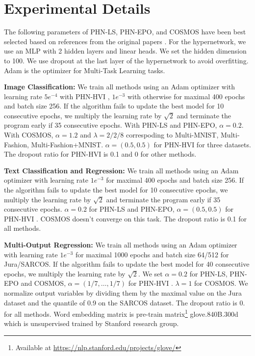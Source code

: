 \documentclass[letterpaper]{article} %
\newcommand{\ourmodel}{PHN-HVI }
\begin{document}
\appendix

\section{Experimental Details}
The following parameters of PHN-LS, PHN-EPO, and COSMOS have been best selected based on references from the original papers \citep{navon2021learning, ruchte2021scalable}. For the hypernetwork, we use an MLP with 2 hidden layers and linear heads. We set the hidden dimension to 100. We use dropout at the last layer of the hypernetwork to avoid overfitting. Adam is the optimizer for Multi-Task Learning tasks.

\textbf{Image Classification:} We train all methods using an Adam optimizer with learning rate $5e^{-4}$ with \ourmodel,  $1e^{-3}$ with otherwise for maximal 400 epochs and batch size 256. If the algorithm fails to update the best model for 10 consecutive epochs, we multiply the learning rate by $\sqrt{2}$ and terminate the program early if 35 consecutive epochs. With PHN-LS and PHN-EPO, $\alpha = 0.2$. With COSMOS, $\alpha=1.2$ and $\lambda = 2/2/8$ correspoding to Multi-MNIST, Multi-Fashion, Multi-Fashion+MNIST. $\alpha = (0.5, 0.5)$ for \ourmodel for three datasets. The dropout ratio for \ourmodel is 0.1 and 0 for other methods.

\textbf{Text Classification and Regression:} We train all methods using an Adam optimizer with learning rate  $1e^{-3}$ for maximal 400 epochs and batch size 256. If the algorithm fails to update the best model for 10 consecutive epochs, we multiply the learning rate by $\sqrt{2}$ and terminate the program early if 35 consecutive epochs. $\alpha = 0.2$ for PHN-LS and PHN-EPO, $\alpha = (0.5, 0.5)$ for \ourmodel. COSMOS doesn't converge on this task. The dropout ratio is 0.1 for all methods.

\textbf{Multi-Output Regression:} We train all methods using an Adam optimizer with learning rate  $1e^{-3}$ for maximal 1000 epochs and batch size 64/512 for Jura/SARCOS. If the algorithm fails to update the best model for 40 consecutive epochs, we multiply the learning rate by $\sqrt{2}$. We set $\alpha = 0.2$ for PHN-LS, PHN-EPO and COSMOS, $\alpha = (1/7,\dots, 1/7)$ for \ourmodel.  $\lambda=1$ for COSMOS. We normalize output variables by dividing them by the maximal value on the Jura dataset and the quantile of 0.9 on the SARCOS dataset. The dropout ratio is 0. for all methods. Word embedding matrix is pre-train matrix\footnote{Available at \url{https://nlp.stanford.edu/projects/glove/}}  glove.840B.300d which is unsupervised trained by Stanford research group.
\end{document}
